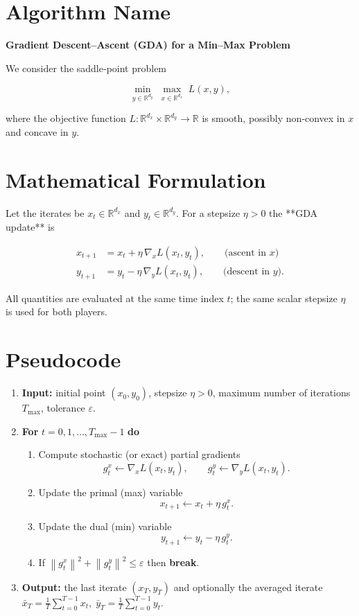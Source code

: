 \documentclass{article}
\newcommand{\norm}[1]{\left\lVert #1 \right\rVert}
\begin{document}
\section*{Algorithm Name}
\textbf{Gradient Descent–Ascent (GDA) for a Min–Max Problem}  

We consider the saddle‑point problem  

\[
\min_{y\in\mathbb R^{d_y}}\;\max_{x\in\mathbb R^{d_x}} \;L(x,y),
\]

where the objective function \(L:\mathbb R^{d_x}\times\mathbb R^{d_y}\to\mathbb R\) is smooth, possibly non‑convex in \(x\) and concave in \(y\).

\section*{Mathematical Formulation}
Let the iterates be \(x_t\in\mathbb R^{d_x}\) and \(y_t\in\mathbb R^{d_y}\).  
For a stepsize \(\eta>0\) the **GDA update** is  

\[
\boxed{
\begin{aligned}
x_{t+1} &= x_t + \eta \,\nabla_x L(x_t,y_t) , \qquad\text{(ascent in }x\text{)}\\[4pt]
y_{t+1} &= y_t - \eta \,\nabla_y L(x_t,y_t) , \qquad\text{(descent in }y\text{)} .
\end{aligned}}
\tag{1}
\]

All quantities are evaluated at the same time index \(t\); the same scalar stepsize \(\eta\) is used for both players.

\section*{Pseudocode}
\begin{enumerate}[label=\textbf{Step \arabic*:}, leftmargin=*, itemsep=2pt]
\item \textbf{Input:} initial point \((x_0,y_0)\), stepsize \(\eta>0\), maximum number of iterations \(T_{\max}\), tolerance \(\varepsilon\).
\item \textbf{For} \(t=0,1,\dots ,T_{\max}-1\) \textbf{do}
\begin{enumerate}[label=\arabic*.]
\item Compute stochastic (or exact) partial gradients
\[
g^x_t \gets \nabla_x L(x_t,y_t),\qquad
g^y_t \gets \nabla_y L(x_t,y_t).
\]
\item Update the primal (max) variable
\[
x_{t+1} \gets x_t + \eta\, g^x_t .
\]
\item Update the dual (min) variable
\[
y_{t+1} \gets y_t - \eta\, g^y_t .
\]
\item If \(\norm{g^x_t}^2+\norm{g^y_t}^2\le\varepsilon\) then \textbf{break}.
\end{enumerate}
\item \textbf{Output:} the last iterate \((x_T,y_T)\) and optionally the averaged iterate 
\(\bar x_T=\tfrac1T\sum_{t=0}^{T-1}x_t,\;\bar y_T=\tfrac1T\sum_{t=0}^{T-1}y_t\).
\end{enumerate}
\end{document}
